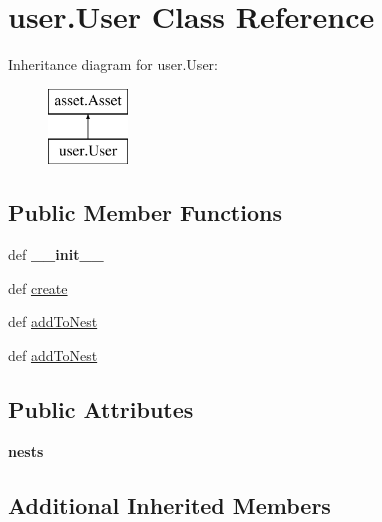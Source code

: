 \hypertarget{classuser_1_1_user}{\section{user.\-User Class Reference}
\label{classuser_1_1_user}
}
Inheritance diagram for user.\-User\-:\begin{figure}[H]
\begin{center}
\leavevmode
\includegraphics[height=2.000000cm]{classuser_1_1_user}
\end{center}
\end{figure}
\subsection*{Public Member Functions}
\begin{DoxyCompactItemize}
\item 
\hypertarget{classuser_1_1_user_af37c1e601519fef697f986c3334e0bf0}{def {\bfseries \-\_\-\-\_\-init\-\_\-\-\_\-}}\label{classuser_1_1_user_af37c1e601519fef697f986c3334e0bf0}

\item 
def \hyperlink{classuser_1_1_user_a537f4e3e8b43f40882b9b149e7adca2e}{create}
\item 
def \hyperlink{classuser_1_1_user_a05d0ea577c0ad94aa421dc9628de1de3}{add\-To\-Nest}
\item 
def \hyperlink{classuser_1_1_user_a05d0ea577c0ad94aa421dc9628de1de3}{add\-To\-Nest}
\end{DoxyCompactItemize}
\subsection*{Public Attributes}
\begin{DoxyCompactItemize}
\item 
\hypertarget{classuser_1_1_user_ac6ba5d5b3449c476080ddcf1397ac104}{{\bfseries nests}}\label{classuser_1_1_user_ac6ba5d5b3449c476080ddcf1397ac104}

\end{DoxyCompactItemize}
\subsection*{Additional Inherited Members}


